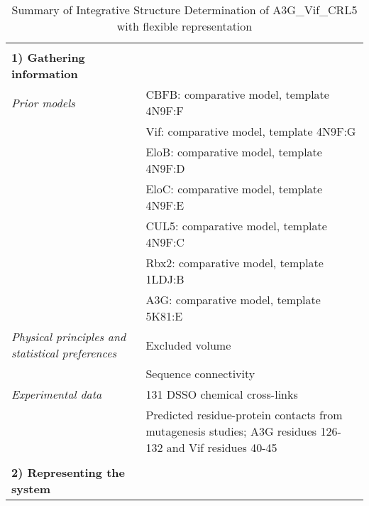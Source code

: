 \documentclass[8pt,a4paper]{article}
\begin{document}
\setcounter{table}{7}

\begin{longtable}{ p{} | p{} } 
\caption{Summary of Integrative Structure Determination of A3G\_Vif\_CRL5 with flexible representation}
  
  &  \\
  \textbf{1) Gathering information} & \\
    \hline

            \textit{Prior models} & CBFB: comparative model, template 4N9F:F\\
            & Vif: comparative model, template 4N9F:G \\
            & EloB: comparative model, template 4N9F:D \\
            & EloC: comparative model, template 4N9F:E \\
            & CUL5: comparative model, template 4N9F:C \\
            & Rbx2: comparative model, template 1LDJ:B \\
            & A3G: comparative model, template 5K81:E \\
                \textit{Physical principles and statistical preferences} & Excluded volume\\
            & Sequence connectivity \\
                \textit{Experimental data} & 131 DSSO chemical cross-links\\
            & Predicted residue-protein contacts from mutagenesis studies; A3G residues 126-132 and Vif residues 40-45 \\
          
    &  \\
    \normalsize{\textbf{2) Representing the system}} & \\
    \hline
    

\end{longtable}
\end{document}
